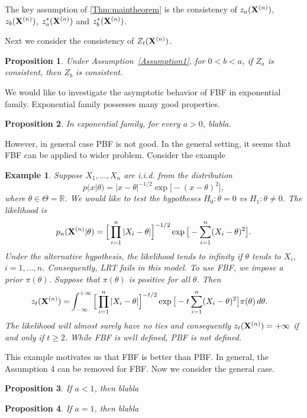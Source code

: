 \documentclass[3p]{elsarticle}
\theoremstyle{plain}
\newtheorem{proposition}{\quad\quad Proposition}
\newtheorem{example}{Example}
\theoremstyle{definition}
\theoremstyle{remark}
\begin{document}
The key assumption of \ref{Thm:maintheorem} is the consistency of $z_a(\mathbf{X}^{(n)})$, $z_b(\mathbf{X}^{(n)})$, $z_a^*(\mathbf{X}^{(n)})$ and $z_{b}^*(\mathbf{X}^{(n)})$.

Next we consider the consistency of $Z_t(\mathbf{X}^{(n)})$.

\begin{proposition}
    Under Assumption~\ref{Assumption1}, for $0<b<a$, if $Z_a$ is consistent, then $Z_{b}$ is consistent.
\end{proposition}



We would like to investigate the asymptotic behavior of FBF in exponential family.
Exponential family possesses many good properties.
\begin{proposition}
    In exponential family, for every $a>0$, blabla.
\end{proposition}


However, in general case PBF is not good.
In the general setting, it seems that FBF can be applied to wider problem.
Consider the example

\begin{example}
Suppose $X_1,\ldots,X_n$ are i.i.d. from the distribution
$$
    p(x|\theta)=|x-\theta|^{-1/2}\exp\big[-(x-\theta)^2\big]
,
$$
    where $\theta\in\Theta=\mathbb{R}$.
    We would like to test the hypotheses $H_0:\theta=0$ vs $H_1:\theta\neq 0$.
    The likelihood is
    $$
    p_n(\mathbf{X}^{(n)}|\theta)=\Big[\prod_{i=1}^n |X_i-\theta|\Big]^{-1/2}
    \exp \big[-\sum_{i=1}^n (X_i-\theta)^2 \big].
    $$
    Under the alternative hypothesis, the likelihood tends to infinity if $\theta$ tends to $X_i$, $i=1,\ldots, n$.
    Consequently, LRT fails in this model.
    To use FBF, we impose a prior $\pi(\theta)$.
    Suppose that $\pi(\theta)$ is positive for all $\theta$.
Then
$$
    \begin{aligned}
        z_t(\mathbf{X}^{(n)})=&
    \int_{-\infty}^{+\infty}
\Big[\prod_{i=1}^n |X_i-\theta|\Big]^{-t/2}
    \exp \big[-t\sum_{i=1}^n (X_i-\theta)^2 \big]
        \pi(\theta)
    \,
    d \theta.
    \end{aligned}
$$
    The likelihood will almost surely have no ties and consequently $z_t(\mathbf{X}^{(n)})=+\infty$ if and only if $t\geq 2$.
    While FBF is well defined, PBF is not defined.
\end{example}

This example motivates us that FBF is better than PBF.
In general, the Assumption 4 can be removed for FBF.
Now we consider the general case.
\begin{proposition}
    If $a<1$, then blabla
\end{proposition}
\begin{proposition}
    If $a=1$, then blabla
\end{proposition}
\end{document}
